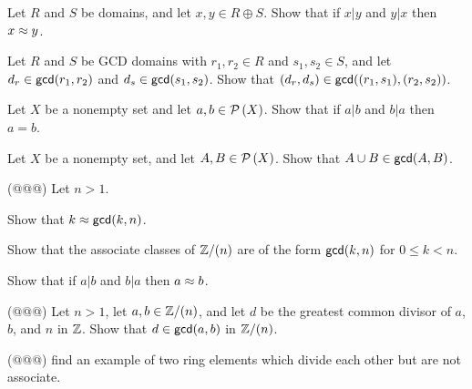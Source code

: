\Exercises%

\begin{exercise}
Let \(R\) and \(S\) be domains, and let \(x,y \in R \oplus S\).
Show that if \(x|y\) and \(y|x\) then \(x \approx y\).
\end{exercise}

\begin{exercise}
Let \(R\) and \(S\) be GCD domains with \(r_1,r_2 \in R\) and \(s_1,s_2 \in S\), and let \(d_r \in \mathsf{gcd}(r_1, r_2)\) and \(d_s \in \mathsf{gcd}(s_1, s_2)\).
Show that \((d_r, d_s) \in \mathsf{gcd}((r_1,s_1), (r_2,s_2))\).
\end{exercise}

\begin{exercise}
Let \(X\) be a nonempty set and let \(a,b \in \mathcal{P}\left(X\right)\).
Show that if \(a|b\) and \(b|a\) then \(a = b\).
\end{exercise}

\begin{exercise}
Let \(X\) be a nonempty set, and let \(A, B \in \mathcal{P}\left(X\right)\).
Show that \(A \cup B \in \mathsf{gcd}(A, B)\).
\end{exercise}

\begin{exercise}
(@@@) Let \(n > 1\).
\begin{proplist*}
\item Show that \(k \approx \mathsf{gcd}(k, n)\).
\item Show that the associate classes of \(\mathbb{Z}/(n)\) are of the form \(\mathsf{gcd}(k, n)\) for \(0 \leq k < n\).
\item Show that if \(a|b\) and \(b|a\) then \(a \approx b\).
\end{proplist*}
\end{exercise}

\begin{exercise}
(@@@) Let \(n > 1\), let \(a,b \in \mathbb{Z}/(n)\), and let \(d\) be the greatest common divisor of \(a\), \(b\), and \(n\) in \(\mathbb{Z}\).
Show that \(d \in \mathsf{gcd}(a, b)\) in \(\mathbb{Z}/(n)\).
\end{exercise}

\begin{exercise}
(@@@) find an example of two ring elements which divide each other but are not associate.
\end{exercise}

